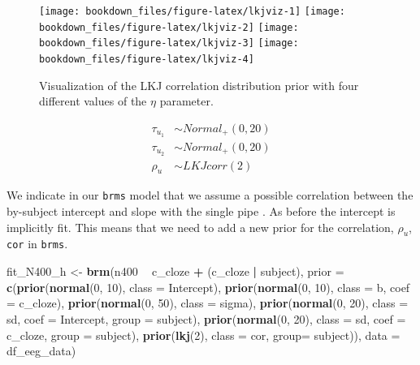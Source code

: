 \documentclass[12pt,]{krantz}
\newenvironment{Shaded}{\begin{snugshade}}{\end{snugshade}}
\newcommand{\KeywordTok}[1]{\textcolor[rgb]{0.13,0.29,0.53}{\textbf{#1}}}
\newcommand{\DataTypeTok}[1]{\textcolor[rgb]{0.13,0.29,0.53}{#1}}
\newcommand{\DecValTok}[1]{\textcolor[rgb]{0.00,0.00,0.81}{#1}}
\newcommand{\StringTok}[1]{\textcolor[rgb]{0.31,0.60,0.02}{#1}}
\newcommand{\OperatorTok}[1]{\textcolor[rgb]{0.81,0.36,0.00}{\textbf{#1}}}
\newcommand{\NormalTok}[1]{#1}
\theoremstyle{definition}
\theoremstyle{definition}
\theoremstyle{definition}
\theoremstyle{remark}
\begin{document}
\begin{figure}
\texttt{[image: bookdown\_files/figure-latex/lkjviz-1]} \texttt{[image: bookdown\_files/figure-latex/lkjviz-2]} \texttt{[image: bookdown\_files/figure-latex/lkjviz-3]} \texttt{[image: bookdown\_files/figure-latex/lkjviz-4]} \caption{Visualization of the LKJ correlation distribution prior
with four different values of the \(\eta\) parameter.}\label{fig:lkjviz}
\end{figure}

\begin{equation}
\begin{aligned}
\tau_{u_1} &\sim Normal_+(0,20)\\
\tau_{u_2} &\sim Normal_+(0,20)\\
\rho_u &\sim LKJcorr(2) 
\end{aligned}
\end{equation}

We indicate in our \texttt{brms} model that we assume a possible
correlation between the by-subject intercept and slope with the single
pipe \texttt{\textbar{}}. As before the intercept is implicitly fit.
This means that we need to add a new prior for the correlation,
\(\rho_{u}\), \texttt{cor} in \texttt{brms}.

\begin{Shaded}
\begin{Highlighting}[]
\NormalTok{fit_N400_h <-}\StringTok{ }\KeywordTok{brm}\NormalTok{(n400 }\OperatorTok{~}\StringTok{ }\NormalTok{c_cloze }\OperatorTok{+}\StringTok{ }\NormalTok{(c_cloze }\OperatorTok{|}\StringTok{ }\NormalTok{subject),}
                  \DataTypeTok{prior =}
                      \KeywordTok{c}\NormalTok{(}\KeywordTok{prior}\NormalTok{(}\KeywordTok{normal}\NormalTok{(}\DecValTok{0}\NormalTok{, }\DecValTok{10}\NormalTok{), }\DataTypeTok{class =}\NormalTok{ Intercept),}
                        \KeywordTok{prior}\NormalTok{(}\KeywordTok{normal}\NormalTok{(}\DecValTok{0}\NormalTok{, }\DecValTok{10}\NormalTok{), }\DataTypeTok{class =}\NormalTok{ b, }\DataTypeTok{coef =}\NormalTok{ c_cloze),}
                        \KeywordTok{prior}\NormalTok{(}\KeywordTok{normal}\NormalTok{(}\DecValTok{0}\NormalTok{, }\DecValTok{50}\NormalTok{), }\DataTypeTok{class =}\NormalTok{ sigma),}
                        \KeywordTok{prior}\NormalTok{(}\KeywordTok{normal}\NormalTok{(}\DecValTok{0}\NormalTok{, }\DecValTok{20}\NormalTok{), }\DataTypeTok{class =}\NormalTok{ sd, }\DataTypeTok{coef =}\NormalTok{ Intercept, }\DataTypeTok{group =}\NormalTok{ subject),}
                        \KeywordTok{prior}\NormalTok{(}\KeywordTok{normal}\NormalTok{(}\DecValTok{0}\NormalTok{, }\DecValTok{20}\NormalTok{), }\DataTypeTok{class =}\NormalTok{ sd, }\DataTypeTok{coef =}\NormalTok{ c_cloze, }\DataTypeTok{group =}\NormalTok{ subject),}
                        \KeywordTok{prior}\NormalTok{(}\KeywordTok{lkj}\NormalTok{(}\DecValTok{2}\NormalTok{), }\DataTypeTok{class =}\NormalTok{ cor, }\DataTypeTok{group=}\NormalTok{ subject)),}
              \DataTypeTok{data =}\NormalTok{ df_eeg_data)}
\end{Highlighting}
\end{Shaded}
\end{document}
